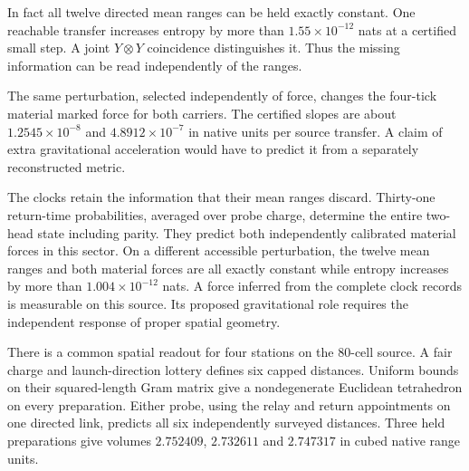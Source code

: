\documentclass[11pt]{article}
\begin{document}
In fact all twelve directed mean ranges can be held exactly constant.
One reachable transfer increases entropy by more than
$1.55\times10^{-12}$ nats at a certified small step. A joint
$Y\otimes Y$ coincidence distinguishes it. Thus the missing
information can be read independently of the ranges.

The same perturbation, selected independently of force, changes the
four-tick material marked force for both carriers. The certified
slopes are about $1.2545\times10^{-8}$ and $4.8912\times10^{-7}$
in native units per source transfer. A claim of extra gravitational
acceleration would have to predict it from a separately reconstructed
metric.

The clocks retain the information that their mean ranges discard.
Thirty-one return-time probabilities, averaged over probe charge,
determine the entire two-head state including parity. They predict
both independently calibrated material forces in this sector. On a
different accessible perturbation, the twelve mean ranges and both
material forces are all exactly constant while entropy increases by
more than $1.004\times10^{-12}$ nats. A force inferred from the
complete clock records is measurable on this source. Its proposed
gravitational role requires the independent response of proper
spatial geometry.

There is a common spatial readout for four stations on the
80-cell source. A fair charge and launch-direction lottery defines six
capped distances. Uniform bounds on their squared-length Gram matrix
give a nondegenerate Euclidean tetrahedron on every preparation.
Either probe, using the relay and return appointments on one directed
link, predicts all six independently surveyed distances. Three held
preparations give volumes $2.752409$, $2.732611$ and $2.747317$ in
cubed native range units.
\end{document}

